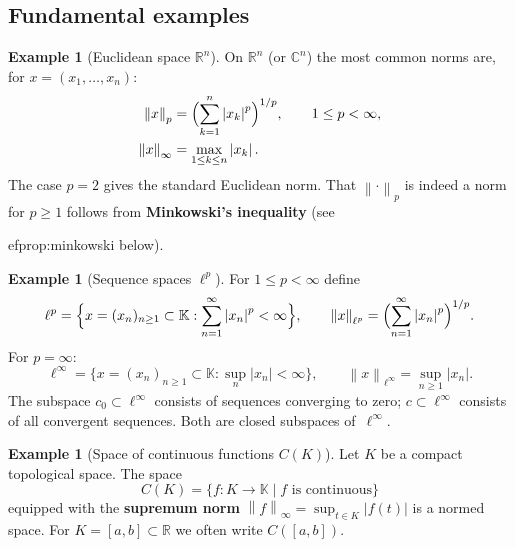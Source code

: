 \documentclass[a4paper,12pt]{book}
\newcommand{\R}{\mathbb{R}}
\newcommand{\C}{\mathbb{C}}
\newcommand{\K}{\mathbb{K}}
\newcommand{\norm}[1]{\left\| #1 \right\|}
\newcommand{\abs}[1]{\left| #1 \right|}
\theoremstyle{definition}
\newtheorem{example}[definition]{Example}
\theoremstyle{plain}
\theoremstyle{remark}
\begin{document}
\subsection{Fundamental examples}
\label{ssec:norm-examples}

\begin{example}[Euclidean space $\R^n$]
\label{ex:Rn-norms}
\index{Rn@$\R^n$}
On $\R^n$ (or $\C^n$) the most common norms are, for
$x=(x_1,\dots,x_n)$:
\begin{align}
  \norm{x}_p &= \Bigl(\sum_{k=1}^n \abs{x_k}^p\Bigr)^{1/p},
               \qquad 1\le p<\infty, \label{eq:lp-finite}\\
  \norm{x}_\infty &= \max_{1\le k\le n} \abs{x_k}. \label{eq:linf-finite}
\end{align}
The case $p=2$ gives the standard Euclidean norm.
That $\norm{\cdot}_p$ is indeed a norm for $p\ge 1$ follows from
\textbf{Minkowski's inequality} (see

ef{prop:minkowski} below).
\end{example}

\begin{example}[Sequence spaces $\ell^p$]
\label{ex:ell-p}
For $1 \le p < \infty$ define
\[
  \ell^p = \Bigl\{ x = (x_n)_{n\ge 1} \subset \K :
           \sum_{n=1}^{\infty}\abs{x_n}^p < \infty \Bigr\},
  \qquad
  \norm{x}_{\ell^p} = \Bigl(\sum_{n=1}^{\infty}\abs{x_n}^p\Bigr)^{1/p}.
\]
For $p=\infty$:
\[
  \ell^\infty = \bigl\{ x = (x_n)_{n\ge 1} \subset \K :
                \sup_n \abs{x_n}<\infty \bigr\},
  \qquad
  \norm{x}_{\ell^\infty} = \sup_{n\ge 1}\abs{x_n}.
\]
The subspace $c_0\subset\ell^\infty$ consists of sequences
converging to zero; $c\subset\ell^\infty$ consists of all
convergent sequences.  Both are closed subspaces of~$\ell^\infty$.
\end{example}

\begin{example}[Space of continuous functions $C(K)$]
\label{ex:CK}
Let $K$ be a compact topological space.  The space
\[
  C(K) = \{ f : K \to \K \mid f \text{ is continuous} \}
\]
equipped with the \textbf{supremum norm}
$\norm{f}_\infty = \sup_{t\in K}\abs{f(t)}$ is a normed space.
For $K=[a,b]\subset\R$ we often write $C([a,b])$.
\end{example}
\end{document}
